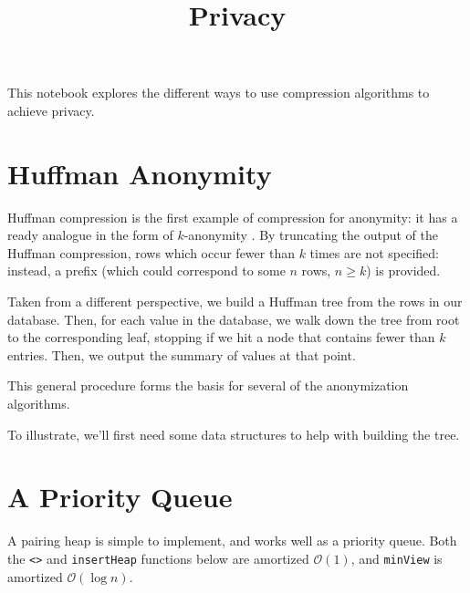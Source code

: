 \documentclass[11pt]{article}
\title{Privacy}
\begin{document}
    
    
    \maketitle
    
    

    
    This notebook explores the different ways to use compression algorithms
to achieve privacy.

    \hypertarget{huffman-anonymity}{%
\section{Huffman Anonymity}\label{huffman-anonymity}}

Huffman compression is the first example of compression for anonymity:
it has a ready analogue in the form of \(k\)-anonymity
\cite{2201627/S5ZJQFX5}. By truncating the output of the Huffman
compression, rows which occur fewer than \(k\) times are not specified:
instead, a prefix (which could correspond to some \(n\) rows,
\(n \geq k\)) is provided.

Taken from a different perspective, we build a Huffman tree from the
rows in our database. Then, for each value in the database, we walk down
the tree from root to the corresponding leaf, stopping if we hit a node
that contains fewer than \(k\) entries. Then, we output the summary of
values at that point.

This general procedure forms the basis for several of the anonymization
algorithms.

    To illustrate, we'll first need some data structures to help with
building the tree.

    \hypertarget{a-priority-queue}{%
\section{A Priority Queue}\label{a-priority-queue}}

A pairing heap \cite{2201627/9H95638W} is simple to implement, and works
well as a priority queue. Both the \texttt{\textless{}\textgreater{}}
and \texttt{insertHeap} functions below are amortized
\(\mathcal{O}(1)\), and \texttt{minView} is amortized
\(\mathcal{O}(\log n)\).
\end{document}
